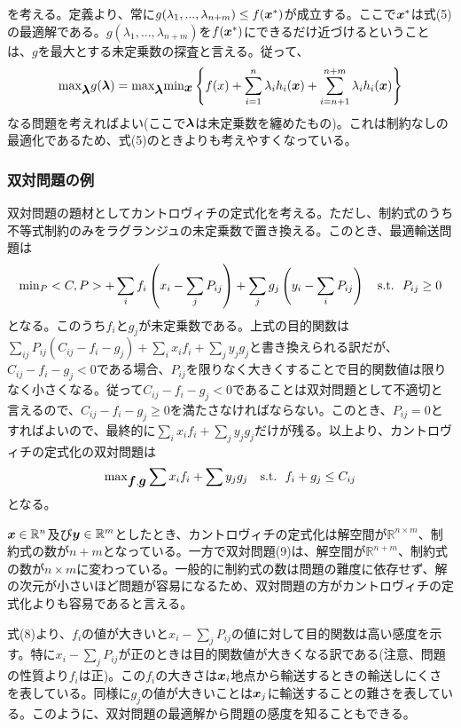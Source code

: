 \documentclass[dvipdfmx, 9pt, a4paper]{jsarticle}
\newcommand{\bm}[1]{{\mbox{\boldmath $#1$}}}
\begin{document}
を考える。定義より、常に$g(\lambda_1, ..., \lambda_{n+m}) \leq f(\bm x^*)$が成立する。ここで$\bm x^*$は式(5)の最適解である。$g(\lambda_1, ..., \lambda_{n+m})$を$f(\bm x^*)$にできるだけ近づけるということは、$g$を最大とする未定乗数の探査と言える。従って、
\begin{equation}
{\rm max}_{\bm \lambda}g(\bm \lambda)={\rm max}_{\bm \lambda}{\rm min}_{\bm x}\left\{ f(x)+\sum_{i=1}^n\lambda_ih_i(\bm x)+\sum_{i=n+1}^{n+m}\lambda_ih_i(\bm x) \right\}
\end{equation}
なる問題を考えればよい(ここで$\bm \lambda$は未定乗数を纏めたもの)。これは制約なしの最適化であるため、式(5)のときよりも考えやすくなっている。

\subsubsection{双対問題の例}
双対問題の題材としてカントロヴィチの定式化を考える。ただし、制約式のうち不等式制約のみをラグランジュの未定乗数で置き換える。このとき、最適輸送問題は
\begin{equation}
{\rm min}_{P} <C, P> + \sum_if_i\left(x_i-\sum_jP_{ij}\right)+\sum_jg_j\left(y_i-\sum_iP_{ij}\right)~~~{\rm s.t.}~~P_{ij} \geq 0
\end{equation}
となる。このうち$f_i$と$g_j$が未定乗数である。上式の目的関数は$\sum_{ij}P_{ij}(C_{ij}-f_i-g_j)+\sum_ix_if_i+\sum_jy_jg_j$と書き換えられる訳だが、$C_{ij}-f_i-g_j < 0$である場合、$P_{ij}$を限りなく大きくすることで目的関数値は限りなく小さくなる。従って$C_{ij}-f_i-g_j < 0$であることは双対問題として不適切と言えるので、$C_{ij}-f_i-g_j \geq 0$を満たさなければならない。このとき、$P_{ij}=0$とすればよいので、最終的に$\sum_ix_if_i+\sum_jy_jg_j$だけが残る。以上より、カントロヴィチの定式化の双対問題は
\begin{equation}
{\rm max}_{\bm f, \bm g}\sum x_if_i+\sum y_jg_j~~~{\rm s.t.}~~f_i + g_j \leq C_{ij}
\end{equation}
となる。\par
$\bm x \in \mathbb{R}^n$及び$\bm y \in \mathbb{R}^m$としたとき、カントロヴィチの定式化は解空間が$\mathbb{R}^{n\times m}$、制約式の数が$n+m$となっている。一方で双対問題(9)は、解空間が$\mathbb{R}^{n+m}$、制約式の数が$n\times m$に変わっている。一般的に制約式の数は問題の難度に依存せず、解の次元が小さいほど問題が容易になるため、双対問題の方がカントロヴィチの定式化よりも容易であると言える。\par
式(8)より、$f_i$の値が大きいと$x_i-\sum_jP_{ij}$の値に対して目的関数は高い感度を示す。特に$x_i-\sum_jP_{ij}$が正のときは目的関数値が大きくなる訳である(注意、問題の性質より$f_i$は正)。この$f_i$の大きさは$\bm x_i$地点から輸送するときの輸送しにくさを表している。同様に$g_j$の値が大きいことは$\bm x_j$に輸送することの難さを表している。このように、双対問題の最適解から問題の感度を知ることもできる。\par
\end{document}

